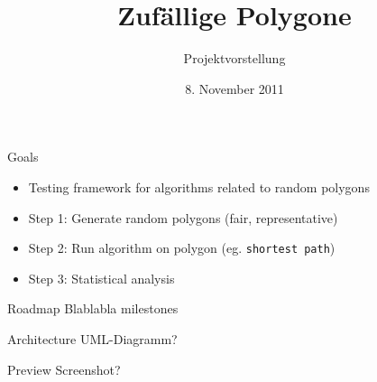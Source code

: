 \documentclass[ucs,11pt]{beamer}
\title[Zufällige Polygone]{Zufällige Polygone}
\subtitle{Projektvorstellung}
\institute[FU Berlin]{Freie Universität Berlin}
\date[08.11.2011]{8. November 2011}
\begin{document}
\begin{frame}[plain]
	\titlepage
\end{frame}

\begin{frame}{Goals}
	\begin{itemize}
	\item Testing framework for algorithms related to random polygons
	\item Step 1: Generate random polygons (fair, representative)
	\item Step 2: Run algorithm on polygon (eg. \texttt{shortest path})
	\item Step 3: Statistical analysis
	\end{itemize}
\end{frame}

\begin{frame}{Roadmap}
Blablabla milestones
\end{frame}

\begin{frame}{Architecture}
UML-Diagramm?
\end{frame}

\begin{frame}{Preview}
Screenshot?
\end{frame}
\end{document}
